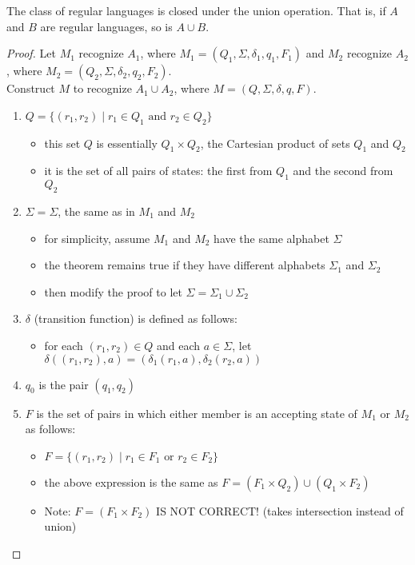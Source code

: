 \documentclass[11pt,a4paper]{article}
\begin{document}
\begin{theorem}
    The class of regular languages is closed under the union operation. That is, if $A$ and $B$ are regular languages, so is $A\cup B$.

    \begin{proof}
        Let $M_1$ recognize $A_1$, where $M_1=(Q_1,\Sigma,\delta_1,q_1,F_1)$ and $M_2$ recognize $A_2$, where $M_2=(Q_2,\Sigma,\delta_2,q_2,F_2)$. \\

        Construct $M$ to recognize $A_1\cup A_2$, where $M=(Q,\Sigma,\delta,q,F)$.
        \begin{enumerate}
            \item $Q=\{(r_1,r_2)\mid r_1\in Q_1\text{ and }r_2\in Q_2\}$
            \begin{itemize}
                \item this set $Q$ is essentially $Q_1\times Q_2$, the Cartesian product of sets $Q_1$ and $Q_2$
                \item it is the set of all pairs of states: the first from $Q_1$ and the second from $Q_2$
            \end{itemize}
            \item $\Sigma=\Sigma$, the same as in $M_1$ and $M_2$
            \begin{itemize}
                \item for simplicity, assume $M_1$ and $M_2$ have the same alphabet $\Sigma$
                \item the theorem remains true if they have different alphabets $\Sigma_1$ and $\Sigma_2$
                \item then modify the proof to let $\Sigma=\Sigma_1\cup\Sigma_2$
            \end{itemize}
            \item $\delta$ (transition function) is defined as follows:
                \begin{itemize}
                    \item for each $(r_1,r_2)\in Q$ and each $a\in\Sigma$, let $\delta((r_1,r_2),a)=(\delta_1(r_1,a),\delta_2(r_2,a))$
                \end{itemize}
            \item $q_0$ is the pair $(q_1,q_2)$
            \item $F$ is the set of pairs in which either member is an accepting state of $M_1$ or $M_2$ as follows:
            \begin{itemize}
                \item $F=\{(r_1,r_2)\mid r_1\in F_1\text{ or }r_2\in F_2\}$
                \item the above expression is the same as $F=(F_1\times Q_2)\cup(Q_1\times F_2)$
                \item Note: $F=(F_1\times F_2)$ IS NOT CORRECT! (takes intersection instead of union)
            \end{itemize}
        \end{enumerate}
    \end{proof}
\end{theorem}
\end{document}
